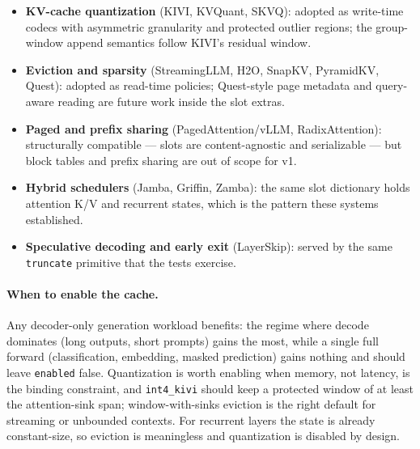 \begin{itemize}[leftmargin=*]
    \item \textbf{KV-cache quantization} (KIVI, KVQuant, SKVQ): adopted as write-time codecs with asymmetric granularity and protected outlier regions; the group-window append semantics follow KIVI's residual window.
    \item \textbf{Eviction and sparsity} (StreamingLLM, H2O, SnapKV, PyramidKV, Quest): adopted as read-time policies; Quest-style page metadata and query-aware reading are future work inside the slot extras.
    \item \textbf{Paged and prefix sharing} (PagedAttention/vLLM, RadixAttention): structurally compatible --- slots are content-agnostic and serializable --- but block tables and prefix sharing are out of scope for v1.
    \item \textbf{Hybrid schedulers} (Jamba, Griffin, Zamba): the same slot dictionary holds attention K/V and recurrent states, which is the pattern these systems established.
    \item \textbf{Speculative decoding and early exit} (LayerSkip): served by the same \texttt{truncate} primitive that the tests exercise.
\end{itemize}

\paragraph{When to enable the cache.} Any decoder-only generation workload benefits: the regime where decode dominates (long outputs, short prompts) gains the most, while a single full forward (classification, embedding, masked prediction) gains nothing and should leave \texttt{enabled} false. Quantization is worth enabling when memory, not latency, is the binding constraint, and \texttt{int4\_kivi} should keep a protected window of at least the attention-sink span; window-with-sinks eviction is the right default for streaming or unbounded contexts. For recurrent layers the state is already constant-size, so eviction is meaningless and quantization is disabled by design.
